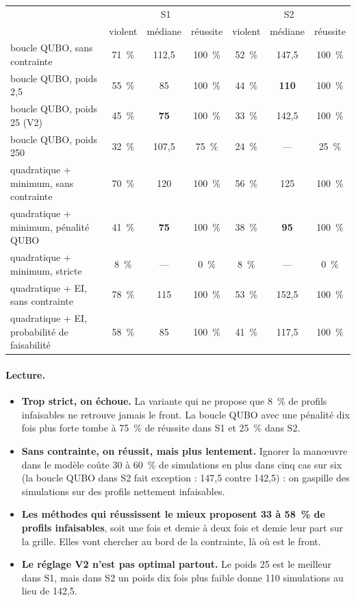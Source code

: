 \begin{center}
\small
\renewcommand{\arraystretch}{1.15}
\setlength{\tabcolsep}{4pt}
\begin{tabular}{lcccccc}
\toprule
 & \multicolumn{3}{c}{S1} & \multicolumn{3}{c}{S2} \\
 & violent & médiane & réussite & violent & médiane & réussite \\
\midrule
boucle QUBO, sans contrainte & 71~\% & 112,5 & 100~\% & 52~\% & 147,5 & 100~\% \\
boucle QUBO, poids 2,5 & 55~\% & 85 & 100~\% & 44~\% & \textbf{110} & 100~\% \\
boucle QUBO, poids 25 (V2) & 45~\% & \textbf{75} & 100~\% & 33~\% & 142,5 & 100~\% \\
boucle QUBO, poids 250 & 32~\% & 107,5 & 75~\% & 24~\% & --- & 25~\% \\
\midrule
quadratique + minimum, sans contrainte & 70~\% & 120 & 100~\% & 56~\% & 125 & 100~\% \\
quadratique + minimum, pénalité QUBO & 41~\% & \textbf{75} & 100~\% & 38~\% & \textbf{95} & 100~\% \\
quadratique + minimum, stricte & 8~\% & --- & 0~\% & 8~\% & --- & 0~\% \\
\midrule
quadratique + EI, sans contrainte & 78~\% & 115 & 100~\% & 53~\% & 152,5 & 100~\% \\
quadratique + EI, probabilité de faisabilité & 58~\% & 85 & 100~\% & 41~\% & 117,5 & 100~\% \\
\bottomrule
\end{tabular}
\end{center}

\paragraph{Lecture.}
\begin{itemize}
\item \textbf{Trop strict, on échoue.} La variante qui ne propose que 8~\% de profils infaisables ne retrouve jamais le front. La boucle QUBO avec une pénalité dix fois plus forte tombe à 75~\% de réussite dans S1 et 25~\% dans S2.
\item \textbf{Sans contrainte, on réussit, mais plus lentement.} Ignorer la manœuvre dans le modèle coûte 30 à 60~\% de simulations en plus dans cinq cas sur six (la boucle QUBO dans S2 fait exception : 147,5 contre 142,5) : on gaspille des simulations sur des profils nettement infaisables.
\item \textbf{Les méthodes qui réussissent le mieux proposent 33 à 58~\% de profils infaisables}, soit une fois et demie à deux fois et demie leur part sur la grille. Elles vont chercher au bord de la contrainte, là où est le front.
\item \textbf{Le réglage V2 n'est pas optimal partout.} Le poids 25 est le meilleur dans S1, mais dans S2 un poids dix fois plus faible donne 110 simulations au lieu de 142,5.
\end{itemize}

